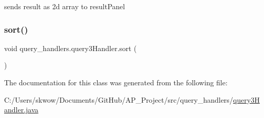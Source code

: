 sends result as 2d array to result\+Panel 

\hypertarget{classquery__handlers_1_1query3_handler_a361412515dada11bc03c4f960a141d62}{}\label{classquery__handlers_1_1query3_handler_a361412515dada11bc03c4f960a141d62} 
\subsubsection{\texorpdfstring{sort()}{sort()}}
{\footnotesize\ttfamily void query\+\_\+handlers.\+query3\+Handler.\+sort (\begin{DoxyParamCaption}{ }\end{DoxyParamCaption})}



The documentation for this class was generated from the following file\+:\begin{DoxyCompactItemize}
\item 
C\+:/\+Users/skwow/\+Documents/\+Git\+Hub/\+A\+P\+\_\+\+Project/src/query\+\_\+handlers/\hyperlink{query3_handler_8java}{query3\+Handler.\+java}\end{DoxyCompactItemize}
